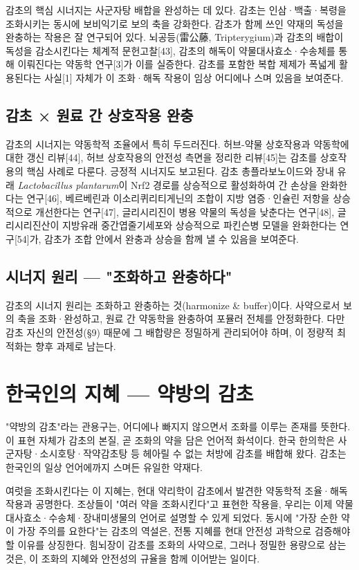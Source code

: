 \documentclass[12pt,oneside]{book}
\begin{document}
감초의 핵심 시너지는 사군자탕 배합을 완성하는 데 있다. 감초는 인삼·백출·복령을 조화시키는 동시에 보비익기로 보의 축을 강화한다. 감초가 함께 쓰인 약재의 독성을 완충하는 작용은 잘 연구되어 있다. 뇌공등(雷公藤, Tripterygium)과 감초의 배합이 독성을 감소시킨다는 체계적 문헌고찰[43], 감초의 해독이 약물대사효소·수송체를 통해 이뤄진다는 약동학 연구[3]가 이를 실증한다. 감초를 포함한 복합 제제가 폭넓게 활용된다는 사실[1] 자체가 이 조화·해독 작용이 임상 어디에나 스며 있음을 보여준다.

\subsection{감초 × 원료 간 상호작용 완충}

감초의 시너지는 약동학적 조율에서 특히 두드러진다. 허브-약물 상호작용과 약동학에 대한 갱신 리뷰[44], 허브 상호작용의 안전성 측면을 정리한 리뷰[45]는 감초를 상호작용의 핵심 사례로 다룬다. 긍정적 시너지도 보고된다. 감초 총플라보노이드와 장내 유래 \textit{Lactobacillus plantarum}이 Nrf2 경로를 상승적으로 활성화하여 간 손상을 완화한다는 연구[46], 베르베린과 이소리퀴리티게닌의 조합이 지방 염증·인슐린 저항을 상승적으로 개선한다는 연구[47], 글리시리진이 병용 약물의 독성을 낮춘다는 연구[48], 글리시리진산이 지방유래 중간엽줄기세포와 상승적으로 파킨슨병 모델을 완화한다는 연구[54]가, 감초가 조합 안에서 완충과 상승을 함께 낼 수 있음을 보여준다.

\subsection{시너지 원리 — "조화하고 완충하다"}

감초의 시너지 원리는 조화하고 완충하는 것(harmonize \& buffer)이다. 사약으로서 보의 축을 조화·완성하고, 원료 간 약동학을 완충하여 포뮬러 전체를 안정화한다. 다만 감초 자신의 안전성(§9) 때문에 그 배합량은 정밀하게 관리되어야 하며, 이 정량적 최적화는 향후 과제로 남는다.

\section{한국인의 지혜 — 약방의 감초}

"약방의 감초"라는 관용구는, 어디에나 빠지지 않으면서 조화를 이루는 존재를 뜻한다. 이 표현 자체가 감초의 본질, 곧 조화의 약을 담은 언어적 화석이다. 한국 한의학은 사군자탕·소시호탕·작약감초탕 등 헤아릴 수 없는 처방에 감초를 배합해 왔다. 감초는 한국인의 일상 언어에까지 스며든 유일한 약재다.

여럿을 조화시킨다는 이 지혜는, 현대 약리학이 감초에서 발견한 약동학적 조율·해독 작용과 공명한다. 조상들이 "여러 약을 조화시킨다"고 표현한 작용을, 우리는 이제 약물대사효소·수송체·장내미생물의 언어로 설명할 수 있게 되었다. 동시에 "가장 순한 약이 가장 주의를 요한다"는 감초의 역설은, 전통 지혜를 현대 안전성 과학으로 검증해야 할 이유를 상징한다. 힘뇌장이 감초를 조화의 사약으로, 그러나 정밀한 용량으로 삼는 것은, 이 조화의 지혜와 안전성의 규율을 함께 이어받는 일이다.
\end{document}
